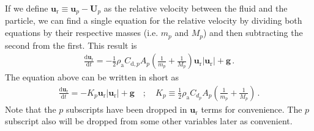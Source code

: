 If we define $\mathbf{u}_\text{r} \equiv \mathbf{u}_p - \mathbf{U}_p$ as the relative velocity between the fluid and the particle, we can find a single equation for the relative velocity by dividing both equations by their respective masses (i.e. $m_p$ and $M_p$) and then subtracting the second from the first. This result is
\begin{align}
    \frac{\text{d} \mathbf{u}_\text{r}}{\text{d} t} = -\frac{1}{2} \rho_\text{a} C_{\text{d},p} A_p \left(\frac{1}{m_p} + \frac{1}{M_p} \right) \mathbf{u}_\text{r} |\mathbf{u}_\text{r}| + \mathbf{g} \,.
\end{align}
The equation above can be written in short as
\begin{align}
    \frac{\text{d} \mathbf{u}_\text{r}}{\text{d} t} = -K_p \mathbf{u}_\text{r} |\mathbf{u}_\text{r}| + \mathbf{g} \quad ; \quad K_p \equiv \frac{1}{2} \rho_\text{a} C_{d_p} A_p \left(\frac{1}{m_p} + \frac{1}{M_p} \right) \,.
\end{align}
Note that the $p$ subscripts have been dropped in $\mathbf{u}_\text{r}$ terms for convenience. The $p$ subscript also will be dropped from some other variables later as convenient.

